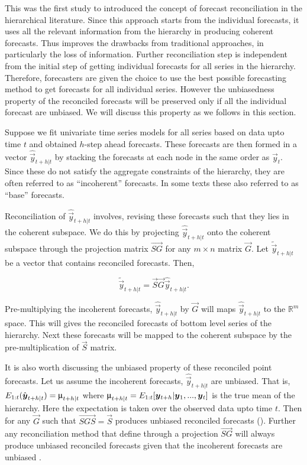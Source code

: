 \documentclass[graybox]{svmult}
\begin{document}
This was the first study to introduced the concept of forecast reconciliation in the hierarchical literature. Since this approach starts from the individual forecasts, it uses all the relevant information from the hierarchy in producing coherent forecasts. Thus improves the drawbacks from traditional approaches, in particularly the loss of information. Further reconciliation step is independent from the initial step of getting individual forecasts for all series in the hierarchy. Therefore, forecasters are given the choice to use the best possible forecasting method to get forecasts for all individual series. However the unbiasedness property of the reconciled forecasts will be preserved only if all the individual forecast are unbiased. We will discuss this property as we follows in this section.  

Suppose we fit univariate time series models for all series based on data upto time $t$ and obtained $h$-step ahead forecasts. These forecasts are then formed in a vector $\hat{\vec{y}}_{t+h|t}$ by stacking the forecasts at each node in the same order as $\vec{y}_{t}$. Since these do not satisfy the aggregate constraints of the hierarchy, they are often referred to as ``incoherent'' forecasts. In some texts these also referred to as ``base'' forecasts. 

Reconciliation of $\hat{\vec{y}}_{t+h|t}$ involves, revising these forecasts such that they lies in the coherent subspace. We do this by projecting $\hat{\vec{y}}_{t+h|t}$ onto the coherent subspace through the projection matrix $\vec{SG}$ for any $m\times n$ matrix $\vec{G}$. Let $\tilde{\vec{y}}_{t+h|t}$ be a vector that contains reconciled forecasts. Then, 

\begin{equation} \label{eq:08}
\tilde{\vec{y}}_{t+h|t}=\vec{S}\vec{G}\hat{\vec{y}}_{t+h|t}.
\end{equation}

Pre-multiplying the incoherent forecasts, $\hat{\vec{y}}_{t+h|t}$ by $\vec{G}$ will maps $\hat{\vec{y}}_{t+h|t}$ to the $\mathbb{R}^m$ space. This will gives the reconciled forecasts of bottom level series of the hierarchy. Next these forecasts will be mapped to the coherent subspace by the pre-multiplication of $\vec{S}$ matrix. 

It is also worth discussing the unbiased property of these reconciled point forecasts. Let us assume the incoherent forecasts, $\hat{\vec{y}}_{t+h|t}$ are unbiased. That is, $E_{1:t}(\hat{\vec{y}}_{t+h|t})=\umu_{t+h|t}$ where $\umu_{t+h|t} = E_{1:t}[\vec{y}_{t+h}|\vec{y}_1,...,\vec{y}_t]$ is the true mean of the hierarchy. Here the expectation is taken over the observed data upto time $t$. Then for any $\vec{G}$ such that $\vec{SGS}=\vec{S}$ produces unbiased reconciled forecasts (\cite{hyndman2011}). Further any reconciliation method that define through a projection $\vec{SG}$ will always produce unbiased reconciled forecasts given that the incoherent forecasts are unbiased \citep{Gamakumara2018}. \\
\end{document}
